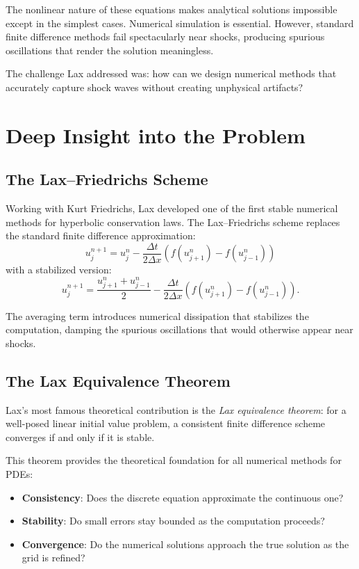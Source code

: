 The nonlinear nature of these equations makes analytical solutions impossible except in the simplest cases. Numerical simulation is essential. However, standard finite difference methods fail spectacularly near shocks, producing spurious oscillations that render the solution meaningless.

The challenge Lax addressed was: how can we design numerical methods that accurately capture shock waves without creating unphysical artifacts?

\section{Deep Insight into the Problem}

\subsection{The Lax--Friedrichs Scheme}

Working with Kurt Friedrichs, Lax developed one of the first stable numerical methods for hyperbolic conservation laws. The Lax--Friedrichs scheme replaces the standard finite difference approximation:
\[
u_j^{n+1} = u_j^n - \frac{\Delta t}{2\Delta x} (f(u_{j+1}^n) - f(u_{j-1}^n))
\]
with a stabilized version:
\[
u_j^{n+1} = \frac{u_{j+1}^n + u_{j-1}^n}{2} - \frac{\Delta t}{2\Delta x} (f(u_{j+1}^n) - f(u_{j-1}^n)).
\]

The averaging term introduces numerical dissipation that stabilizes the computation, damping the spurious oscillations that would otherwise appear near shocks.

\subsection{The Lax Equivalence Theorem}

Lax's most famous theoretical contribution is the \emph{Lax equivalence theorem}: for a well-posed linear initial value problem, a consistent finite difference scheme converges if and only if it is stable.

This theorem provides the theoretical foundation for all numerical methods for PDEs:
\begin{itemize}
\item \textbf{Consistency}: Does the discrete equation approximate the continuous one?
\item \textbf{Stability}: Do small errors stay bounded as the computation proceeds?
\item \textbf{Convergence}: Do the numerical solutions approach the true solution as the grid is refined?
\end{itemize}

